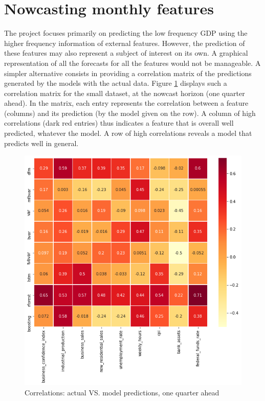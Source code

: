 \section{Nowcasting monthly features}
\label{chapter4_section4}


The project focuses primarily on predicting the low frequency GDP using the higher frequency information of external features. However, the prediction of these features may also represent a subject of interest on its own. A graphical representation of all the forecasts for all the features would not be manageable. A simpler alternative consists in providing a correlation matrix of the predictions generated by the models with the actual data. Figure \ref{fig_c4_s4_1} displays such a correlation matrix for the small dataset, at the nowcast horizon (one quarter ahead). In the matrix, each entry represents the correlation between a feature (columns) and its prediction (by the model given on the row). A column of high correlations (dark red entries) thus indicates a feature that is overall well predicted, whatever the model. A row of high correlations reveals a model that predicts well in general.

\begin{figure}[H]
\centering
\includegraphics[scale=0.5]{images/feature_correlations.png}
\caption{Correlations: actual VS. model predictions, one quarter ahead} \vspace{-5mm}
\label{fig_c4_s4_1}
\end{figure}

